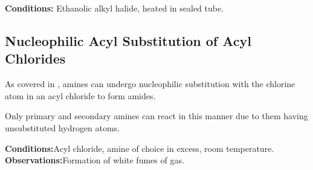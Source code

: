 			\vspace{1.5em}
			\vbox{\textbf{Conditions:}	\tabto{35mm}Ethanolic alkyl halide, heated in sealed tube.}






		\pagebreak
		\subsection{Nucleophilic Acyl Substitution of Acyl Chlorides}

			As covered in \hyperlink{AcylChloridesReactionWithAmines}{}, amines can undergo nucleophilic substitution
			with the chlorine atom in an acyl chloride to form amides.

			Only primary and secondary amines can react in this manner due to them having unsubstituted hydrogen atoms.

			\vspace{1.5em}
			\vbox{\textbf{Conditions:}\tabto{35mm}Acyl chloride, amine of choice in excess, room temperature.}
			\vbox{\textbf{Observations:}\tabto{35mm}Formation of white fumes of  gas.}

